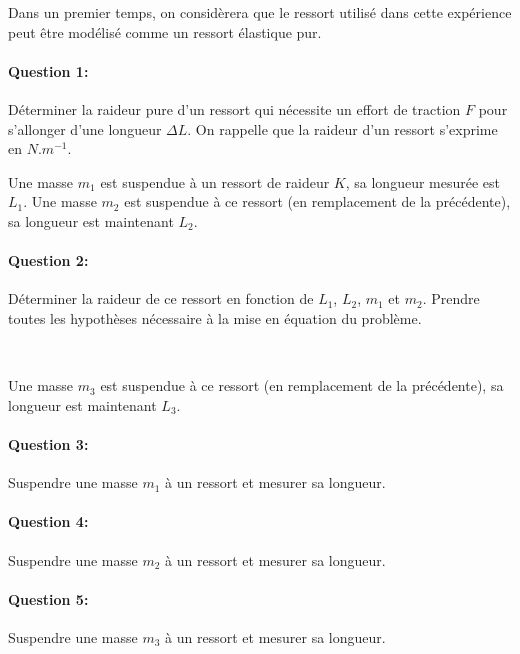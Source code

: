 




Dans un premier temps, on considèrera que le ressort utilisé dans cette expérience peut être modélisé comme un ressort élastique pur. 

\paragraph{Question 1:} Déterminer la raideur pure d'un ressort qui nécessite un effort de traction $F$ pour s'allonger d'une longueur $\Delta L$. On rappelle que la raideur d'un ressort s'exprime en $N.m^{-1}$.

Une masse $m_1$ est suspendue à un ressort de raideur $K$, sa longueur mesurée est $L_1$. Une masse $m_2$ est suspendue à ce ressort (en remplacement de la précédente), sa longueur est maintenant $L_2$.

\paragraph{Question 2:} Déterminer la raideur de ce ressort en fonction de $L_1$, $L_2$, $m_1$ et $m_2$. Prendre toutes les hypothèses nécessaire à la mise en équation du problème.

~\

Une masse $m_3$ est suspendue à ce ressort (en remplacement de la précédente), sa longueur est maintenant $L_3$.


\paragraph{Question 3:} Suspendre une masse $m_1$ à un ressort et mesurer sa longueur.

\paragraph{Question 4:} Suspendre une masse $m_2$ à un ressort et mesurer sa longueur.

\paragraph{Question 5:} Suspendre une masse $m_3$ à un ressort et mesurer sa longueur.

